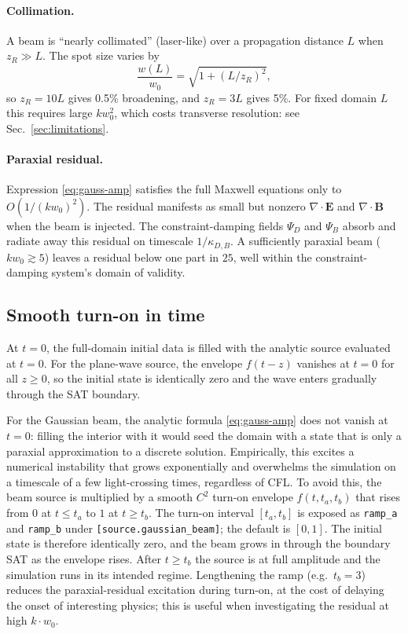 \documentclass[11pt]{article}
\newcommand{\vE}{\mathbf{E}}
\newcommand{\vB}{\mathbf{B}}
\begin{document}
\paragraph{Collimation.} A beam is ``nearly collimated'' (laser-like)
over a propagation distance $L$ when $z_R \gg L$. The spot size varies
by
\begin{equation}
  \frac{w(L)}{w_0} = \sqrt{1 + (L/z_R)^2},
\end{equation}
so $z_R = 10 L$ gives 0.5\% broadening, and $z_R = 3 L$ gives 5\%.
For fixed domain $L$ this requires large $k w_0^2$, which costs
transverse resolution: see Sec.~\ref{sec:limitations}.

\paragraph{Paraxial residual.} Expression \eqref{eq:gauss-amp} satisfies
the full Maxwell equations only to $O(1/(k w_0)^2)$. The residual
manifests as small but nonzero $\nabla \cdot \vE$ and $\nabla \cdot \vB$
when the beam is injected. The constraint-damping fields $\Psi_D$ and
$\Psi_B$ absorb and radiate away this residual on timescale
$1/\kappa_{D,B}$. A sufficiently paraxial beam ($k w_0 \gtrsim 5$)
leaves a residual below one part in $25$, well within the constraint-
damping system's domain of validity.

\subsection{Smooth turn-on in time}

At $t = 0$, the full-domain initial data is filled with the analytic
source evaluated at $t = 0$. For the plane-wave source, the envelope
$f(t - z)$ vanishes at $t = 0$ for all $z \geq 0$, so the initial state
is identically zero and the wave enters gradually through the SAT
boundary.

For the Gaussian beam, the analytic formula \eqref{eq:gauss-amp} does
not vanish at $t = 0$: filling the interior with it would seed the
domain with a state that is only a paraxial approximation to a
discrete solution. Empirically, this excites a numerical instability
that grows exponentially and overwhelms the simulation on a timescale
of a few light-crossing times, regardless of CFL. To avoid this, the
beam source is multiplied by a smooth $C^2$ turn-on envelope
$f(t, t_a, t_b)$ that rises from $0$ at $t \leq t_a$ to $1$ at
$t \geq t_b$. The turn-on interval $[t_a, t_b]$ is exposed as
\texttt{ramp\_a} and \texttt{ramp\_b} under \texttt{[source.gaussian\_beam]};
the default is $[0, 1]$. The initial state is therefore identically
zero, and the beam grows in through the boundary SAT as the envelope
rises. After $t \geq t_b$ the source is at full amplitude and the
simulation runs in its intended regime. Lengthening the ramp (e.g.\
$t_b = 3$) reduces the paraxial-residual excitation during turn-on,
at the cost of delaying the onset of interesting physics; this is
useful when investigating the residual at high $k \cdot w_0$.
\end{document}
